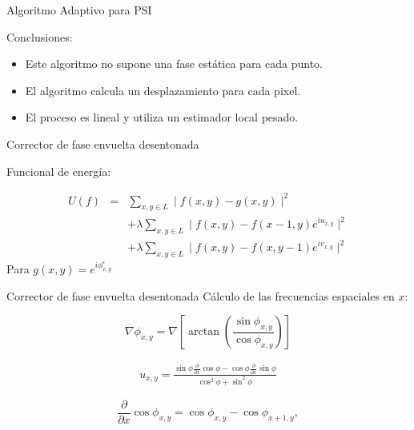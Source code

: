 \documentclass[]{beamer}
\begin{document}
\begin{frame}{Algoritmo Adaptivo para PSI}

Conclusiones:
\begin{itemize}
     \item Este algoritmo no supone una fase est\'atica para cada punto.
     \pause \item El algoritmo calcula un desplazamiento para cada pixel.
     \pause \item El proceso es lineal y utiliza un estimador local pesado.
\end{itemize}

\end{frame}
\begin{frame}{Corrector de fase  envuelta desentonada}

Funcional de energ\'ia:
\begin{center}
\begin{eqnarray*}
U(f) &=& \sum_{x,y\in L} \mid f(x,y) - g(x,y) \mid ^2 \nonumber\\
      &  &+ \lambda \sum_{x,y\in L} 
  \mid f(x,y) - f(x-1,y) e^{i u_{x,y}} \mid^2 \nonumber\\
  & & + \lambda \sum_{x,y\in L} \mid f(x,y) - f(x,y-1) e^{i v_{x,y}} \mid^2
\end{eqnarray*}
Para $g(x,y)= e^{i \phi^\varepsilon_{x,y}}$

\end{center}
\end{frame}
\begin{frame}{Corrector de fase envuelta desentonada}
C\'alculo de las frecuencias espaciales en $x$:
\begin{center}

\begin{equation*}
  \nabla \phi_{x,y} = \nabla \left[ \arctan \left(\frac{\sin{\phi_{x,y}}}	
      {\cos{\phi_{x,y}}}\right)\right]
\end{equation*}

\begin{eqnarray*}
  u_{x,y} = \frac{\sin \phi \frac{\partial}{\partial x}  \cos \phi - \cos 
  \phi \frac{\partial}{\partial x} \sin \phi}{ \cos^2 \phi + \sin^2 \phi }
\end{eqnarray*}

\begin{equation*}
  \frac{\partial}{\partial x} \cos\phi_{x,y} = 
  \cos\phi_{x,y}-\cos\phi_{x+1,y},
\end{equation*}

\end{center}
\end{frame}
\end{document}
